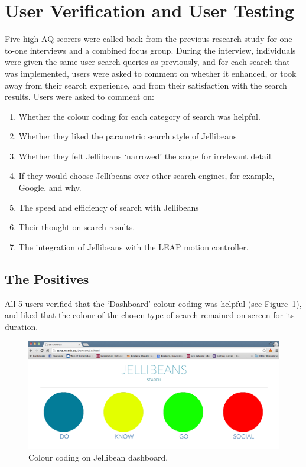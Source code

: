 \documentclass[a4paper, 11pt]{article}
\begin{document}
\section{User Verification and User Testing}
Five high AQ scorers were called back from the previous research study for one-to-one interviews and a combined focus group. During the interview, individuals were given the same user search queries as previously, and for each search that was implemented, users were asked to comment on whether it enhanced, or took away from their search experience, and from their satisfaction with the search results. Users were asked to comment on:
\begin{enumerate}
\item{Whether the colour coding for each category of search was helpful.}
\item{Whether they liked the parametric search style of Jellibeans}
\item{Whether they felt Jellibeans `narrowed' the scope for irrelevant detail.}
\item{If they would choose Jellibeans over other search engines, for example, Google, and why.}
\item{The speed and efficiency of search with Jellibeans}
\item{Their thought on search results.}
\item{The integration of Jellibeans with the LEAP motion controller.}
\end{enumerate}

\subsection{The Positives}
All 5 users verified that the `Dashboard' colour coding was helpful (see Figure~\ref{colourCoding}), and liked that the colour of the chosen type of search remained on screen for its duration.

\begin{figure}[H]
\begin{center}
\includegraphics[scale=0.25]{DoKnowGoSocialDashboard}
\caption{Colour coding on Jellibean dashboard.}
\label{colourCoding}
\end{center}
\end{figure}
\end{document}
